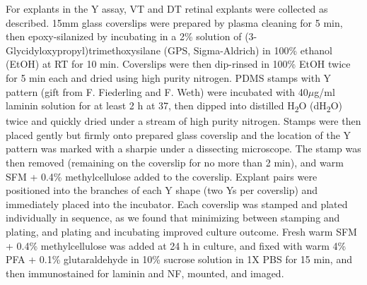 For explants in the Y assay, VT and DT retinal explants were collected as described.
15mm glass coverslips were prepared by plasma cleaning for 5 min, then epoxy-silanized by incubating in a 2\% solution of (3-Glycidyloxypropyl)trimethoxysilane (GPS, Sigma-Aldrich) in 100\% ethanol (EtOH) at RT for 10 min.
Coverslips were then dip-rinsed in 100\% EtOH twice for 5 min each and dried using high purity nitrogen.
PDMS stamps with Y pattern (gift from F. Fiederling and F. Weth) were incubated with 40$\mu$g/ml laminin solution for at least 2 h at 37\textcelsius, then dipped into distilled H\textsubscript{2}O (dH\textsubscript{2}O) twice and quickly dried under a stream of high purity nitrogen.
Stamps were then placed gently but firmly onto prepared glass coverslip and the location of the Y pattern was marked with a sharpie under a dissecting microscope.
The stamp was then removed (remaining on the coverslip for no more than 2 min), and warm SFM + 0.4\% methylcellulose added to the coverslip.
Explant pairs were positioned into the branches of each Y shape (two Ys per coverslip) and immediately placed into the incubator.
Each coverslip was stamped and plated individually in sequence, as we found that minimizing between stamping and plating, and plating and incubating improved culture outcome.
Fresh warm SFM + 0.4\% methylcellulose was added at 24 h in culture, and fixed with warm 4\% PFA + 0.1\% glutaraldehyde in 10\% sucrose solution in 1X PBS for 15 min, and then immunostained for laminin and NF, mounted, and imaged.